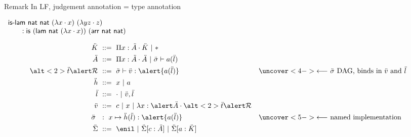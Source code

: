 \documentclass[ignorenonframetext,red]{beamer}
\begin{document}
\begin{frame}{}
  \begin{block}{Remark}
    In LF, judgement annotation = type annotation

    \begin{example}
      $
      \begin{array}{l}
        \text{\textsf{is-lam}}\ \mathsf{nat}\ \mathsf{nat}\ (\lambda{x}\cdot
        x)\ (\lambda{y z}\cdot z) \\ \qquad : \mathsf{is}\ (\mathsf{lam}\
        \mathsf{nat}\ (\lambda{x}\cdot x))\ (\mathsf{arr}\ \mathsf{nat}\
        \mathsf{nat})
      \end{array}
      $
    \end{example}
  \end{block}
  \pause
  \inXLF\inXLFa
  \begin{align*}
    \mk &\gequal \prd\mv\mf\mk \gor \type \\
    \mf &\gequal \prd\mv\mf\mf \gor \sapply\ms{\lapp\mcf\ma} \\
    \alt<2>\mo{\alert\mr} &\gequal
    \sapply\ms{\typ\mval{\alert{\lapp\mcf\ma}}} &&
      \uncover<4->{\text{$\longleftarrow$ $\ms$ DAG, binds in $\mval$ and
          $\ma$}} \\
    \mh &\gequal \mv \gor \mcf \\
    \ma &\gequal \lnil \gor \lcons\mval\ma \\
    \mval &\gequal \mco \gor \mv \gor \lam\mv{\alert\mf}{\alt<2>\mo{\alert\mr}} \\
    \ms\ &\ :\ \mv\mapsto{\laapp\mh\ma{\alert{\lapp\mcf\ma}}} &&
      \uncover<5->{\text{$\longleftarrow$ named implementation}} \\
    \msi &\gequal { \enil \gor \ebinddecl\msi\mco\mf \gor
      \ebinddecl\msi\mcf\mk }
  \end{align*}
\end{frame}
\end{document}
